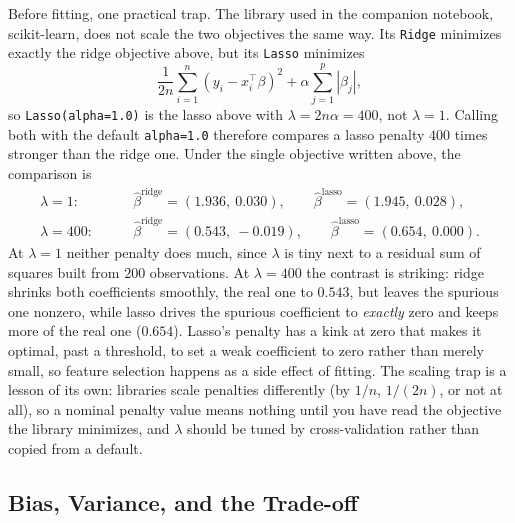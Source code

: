 \documentclass[../ai_in_finance]{subfiles}
\begin{document}
Before fitting, one practical trap. The library used in the companion notebook, scikit-learn, does not scale the two objectives the same way. Its \texttt{Ridge} minimizes exactly the ridge objective above, but its \texttt{Lasso} minimizes
\begin{equation*}
\frac{1}{2n}\sum_{i=1}^n (y_i - x_i^\top \beta)^2 + \alpha \sum_{j=1}^p |\beta_j|,
\end{equation*}
so \texttt{Lasso(alpha=1.0)} is the lasso above with $\lambda = 2n\alpha = 400$, not $\lambda=1$. Calling both with the default \texttt{alpha=1.0} therefore compares a lasso penalty $400$ times stronger than the ridge one. Under the single objective written above, the comparison is
\begin{align*}
\lambda = 1:&\qquad \hat\beta^{\text{ridge}} = (1.936,\ 0.030), \qquad \hat\beta^{\text{lasso}} = (1.945,\ 0.028),\\
\lambda = 400:&\qquad \hat\beta^{\text{ridge}} = (0.543,\ -0.019), \qquad \hat\beta^{\text{lasso}} = (0.654,\ 0.000).
\end{align*}
At $\lambda=1$ neither penalty does much, since $\lambda$ is tiny next to a residual sum of squares built from $200$ observations. At $\lambda=400$ the contrast is striking: ridge shrinks both coefficients smoothly, the real one to $0.543$, but leaves the spurious one nonzero, while lasso drives the spurious coefficient to \emph{exactly} zero and keeps more of the real one ($0.654$). Lasso's penalty has a kink at zero that makes it optimal, past a threshold, to set a weak coefficient to zero rather than merely small, so feature selection happens as a side effect of fitting. The scaling trap is a lesson of its own: libraries scale penalties differently (by $1/n$, $1/(2n)$, or not at all), so a nominal penalty value means nothing until you have read the objective the library minimizes, and $\lambda$ should be tuned by cross-validation rather than copied from a default.

\subsection{Bias, Variance, and the Trade-off}
\label{sec:bias-variance}
\end{document}
